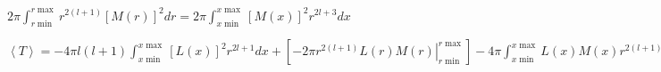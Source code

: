 \documentclass{jarticle}%
\begin{document}
$2\pi%
{\displaystyle\int\nolimits_{r\min}^{r\max}}
r^{2\left(  l+1\right)  }\left[  M\left(  r\right)  \right]  ^{2}dr=2\pi%
{\displaystyle\int\nolimits_{x\min}^{x\max}}
\left[  M\left(  x\right)  \right]  ^{2}r^{2l+3}dx$

$\left\langle T\right\rangle =-4\pi l\left(  l+1\right)
{\displaystyle\int\nolimits_{x\min}^{x\max}}
\left[  L\left(  x\right)  \right]  ^{2}r^{2l+1}dx+\left[  \left.  -2\pi
r^{2\left(  l+1\right)  }L\left(  r\right)  M\left(  r\right)  \right\vert
_{r\min}^{r\max}\right]  -4\pi%
{\displaystyle\int\nolimits_{x\min}^{x\max}}
L\left(  x\right)  M\left(  x\right)  r^{2\left(  l+1\right)  }dx+2\pi%
{\displaystyle\int\nolimits_{x\min}^{x\max}}
\left[  M\left(  x\right)  \right]  ^{2}r^{2l+3}dx$
\end{document}
